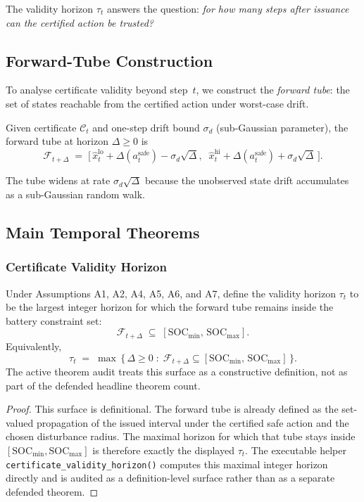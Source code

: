 The validity horizon $\tau_t$ answers the question: \emph{for how many
steps after issuance can the certified action be trusted?}

\subsection{Forward-Tube Construction}

To analyse certificate validity beyond step~$t$, we construct the
\emph{forward tube}: the set of states reachable from the certified
action under worst-case drift.

\begin{definition}
\label{def:forward-tube}
Given certificate $\mathcal{C}_t$ and one-step drift bound
$\sigma_d$ (sub-Gaussian parameter), the forward tube at horizon
$\Delta \ge 0$ is
\[
  \mathcal{F}_{t+\Delta} \;=\;
  \bigl[\,\hat{x}_t^{\text{lo}} + \Delta(a_t^{\text{safe}}) -
  \sigma_d\sqrt{\Delta},\;\;
  \hat{x}_t^{\text{hi}} + \Delta(a_t^{\text{safe}}) +
  \sigma_d\sqrt{\Delta}\,\bigr].
\]
\end{definition}

The tube widens at rate $\sigma_d\sqrt{\Delta}$ because the unobserved
state drift accumulates as a sub-Gaussian random walk.

\subsection{Main Temporal Theorems}

\subsubsection{Certificate Validity Horizon}

\begin{theorem}
\label{thm:cert-horizon}
Under Assumptions A1, A2, A4, A5, A6, and A7, define the validity horizon
$\tau_t$ to be the largest integer horizon for which the forward tube remains
inside the battery constraint set:
\[
  \mathcal{F}_{t+\Delta} \;\subseteq\;
  [\text{SOC}_{\min},\, \text{SOC}_{\max}].
\]
Equivalently,
\[
  \tau_t \;=\; \max\,\bigl\{\,\Delta \ge 0 \;:\;
  \mathcal{F}_{t+\Delta} \subseteq
  [\text{SOC}_{\min},\, \text{SOC}_{\max}]\,\bigr\}.
\]
The active theorem audit treats this surface as a constructive definition, not
as part of the defended headline theorem count.
\end{theorem}

\begin{proof}
This surface is definitional.  The forward tube is already defined as the
set-valued propagation of the issued interval under the certified safe action
and the chosen disturbance radius.  The maximal horizon for which that tube
stays inside $[\text{SOC}_{\min}, \text{SOC}_{\max}]$ is therefore exactly the
displayed $\tau_t$.  The executable helper
\texttt{certificate\_validity\_horizon()} computes this maximal integer
horizon directly and is audited as a definition-level surface rather than as a
separate defended theorem.
\end{proof}

